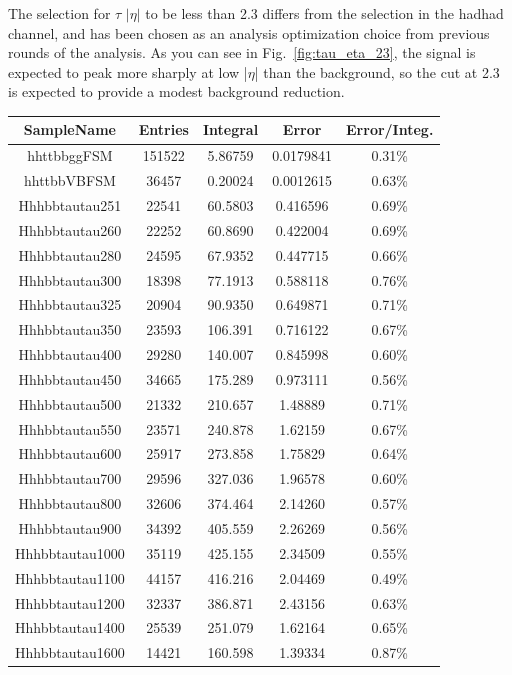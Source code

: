 The selection for $\tau$ $|\eta|$ to be less than 2.3 differs from the selection in the hadhad channel, and has been chosen as an analysis optimization choice from previous rounds of the analysis.  As you can see in Fig.~\ref{fig:tau_eta_23}, the signal is expected to peak more sharply at low |$\eta$| than the background, so the cut at 2.3 is expected to provide a modest background reduction.

	
  
\begin{table}
    \centering
    \scriptsize
    \begin{tabular}{|c|c|c|c|c|}
    	\hline
	\hline
	SampleName & Entries & Integral & Error & Error/Integ.\\

	\hline
 	\hline    
 	hhttbbggFSM     &151522 &5.86759 & 0.0179841&0.31\% \\ 
	hhttbbVBFSM	   	&36457  & 0.20024&0.0012615&0.63\% \\
	Hhhbbtautau251	& 22541 &	60.5803  & 0.416596	& 0.69\% \\
	Hhhbbtautau260	& 22252 &	60.8690  & 0.422004	& 0.69\% \\
	Hhhbbtautau280	& 24595 &	67.9352  & 0.447715	& 0.66\% \\
	Hhhbbtautau300	& 18398 &	77.1913  & 0.588118	& 0.76\% \\
	Hhhbbtautau325	& 20904 &	90.9350  & 0.649871	& 0.71\% \\
	Hhhbbtautau350	& 23593 &	106.391  & 0.716122	& 0.67\% \\
	Hhhbbtautau400	& 29280 &	140.007  & 0.845998	& 0.60\% \\
	Hhhbbtautau450	& 34665 &	175.289  & 0.973111	& 0.56\% \\
	Hhhbbtautau500	& 21332 &	210.657  & 1.48889	& 0.71\% \\
	Hhhbbtautau550	& 23571 &	240.878  & 1.62159	& 0.67\% \\
	Hhhbbtautau600	& 25917 &	273.858  & 1.75829	& 0.64\% \\
	Hhhbbtautau700	& 29596 &	327.036  & 1.96578	& 0.60\% \\
	Hhhbbtautau800	& 32606 &	374.464  & 2.14260	& 0.57\% \\
	Hhhbbtautau900	& 34392 &	405.559  & 2.26269	& 0.56\% \\
	Hhhbbtautau1000	& 35119 &	425.155  & 2.34509	& 0.55\% \\
	Hhhbbtautau1100	& 44157 &	416.216  & 2.04469	& 0.49\% \\
	Hhhbbtautau1200	& 32337 &	386.871  & 2.43156	& 0.63\% \\
	Hhhbbtautau1400	& 25539 &	251.079  & 1.62164	& 0.65\% \\
	Hhhbbtautau1600	& 14421 &	160.598  & 1.39334	& 0.87\% \\
	\hline
	

\end{tabular}
\end{table}
